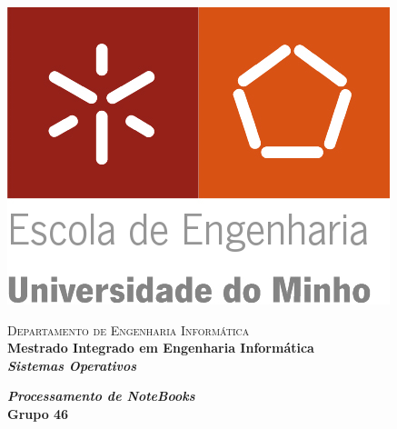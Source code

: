 \begin{titlepage}


\begin{minipage}{0.3\textwidth}
\begin{flushleft} 
\includegraphics[width=\textwidth]{logo.png}
\end{flushleft}
\end{minipage}
\begin{minipage}{0.6\textwidth}
\begin{flushright} 

\textsc{Departamento de Engenharia Informática}\\[0.1cm]
\bfseries Mestrado Integrado em Engenharia Informática \\ [0.1cm]
\bfseries \textit{Sistemas Operativos}\\[8mm]

\end{flushright}
\end{minipage}


\vspace{3cm}


\begin{center}



\Large \textbf{\textit{Processamento de NoteBooks}}\\[1.5cm]


{\Large \bfseries Grupo 46\\[2cm] }



\end{center}
\end{titlepage}
